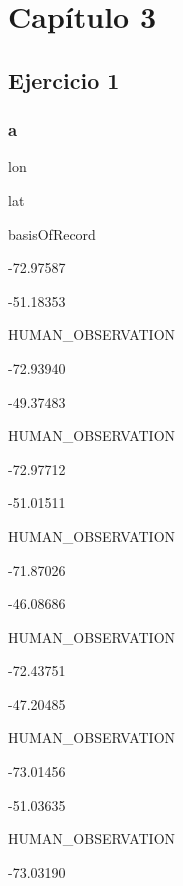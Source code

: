 \documentclass[]{book}
\newenvironment{Shaded}{\begin{snugshade}}{\end{snugshade}}
\newcommand{\KeywordTok}[1]{\textcolor[rgb]{0.13,0.29,0.53}{\textbf{#1}}}
\newcommand{\NormalTok}[1]{#1}
\newcommand{\OperatorTok}[1]{\textcolor[rgb]{0.81,0.36,0.00}{\textbf{#1}}}
\newcommand{\StringTok}[1]{\textcolor[rgb]{0.31,0.60,0.02}{#1}}
\begin{document}
\hypertarget{capitulo-3}{%
\section{Capítulo 3}\label{capitulo-3}}

\hypertarget{ejercicio-1-5}{%
\subsection{Ejercicio 1}\label{ejercicio-1-5}}

\hypertarget{a}{%
\subsubsection{a}\label{a}}

\begin{Shaded}
\end{Shaded}

lon

lat

basisOfRecord

-72.97587

-51.18353

HUMAN\_OBSERVATION

-72.93940

-49.37483

HUMAN\_OBSERVATION

-72.97712

-51.01511

HUMAN\_OBSERVATION

-71.87026

-46.08686

HUMAN\_OBSERVATION

-72.43751

-47.20485

HUMAN\_OBSERVATION

-73.01456

-51.03635

HUMAN\_OBSERVATION

-73.03190
\end{document}
